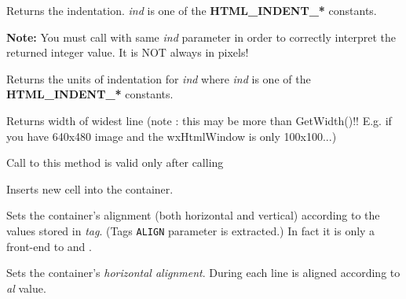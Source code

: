 
Returns the indentation. {\it ind} is one of the {\bf HTML\_INDENT\_*} constants.

{\bf Note:} You must call 
with same {\it ind} parameter in order to correctly interpret the returned integer value.
It is NOT always in pixels!

\label{wxhtmlcontainercellgetindentunits}


Returns the units of indentation for {\it ind} where {\it ind} is one
of the {\bf HTML\_INDENT\_*} constants.

\label{wxhtmlcontainercellgetmaxlinewidth}


Returns width of widest line (note : this may be more than GetWidth()!!
E.g. if you have 640x480 image and the wxHtmlWindow is only 100x100...)

Call to this method is valid only after calling 

\label{wxhtmlcontainercellinsertcell}


Inserts new cell into the container.

\label{wxhtmlcontainercellsetalign}


Sets the container's alignment (both horizontal and vertical) according to
the values stored in {\it tag}. (Tags {\tt ALIGN} parameter is extracted.) In fact
it is only a front-end to 
and .

\label{wxhtmlcontainercellsetalignhor}


Sets the container's {\it horizontal alignment}. During 
each line is aligned according to {\it al} value.

